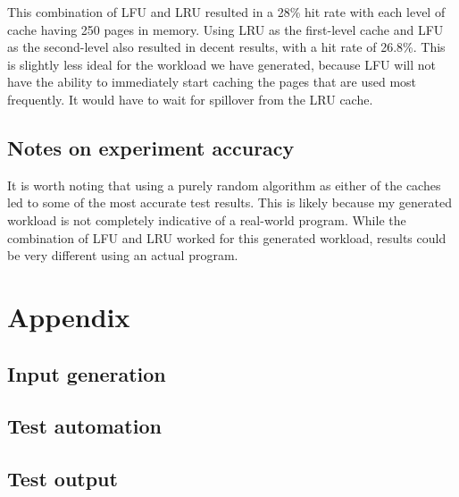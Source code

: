 \documentclass[paper=a4, fontsize=11pt]{scrartcl} %
\numberwithin{equation}{section} %
\numberwithin{figure}{section} %
\numberwithin{table}{section} %
\begin{document}
This combination of LFU and LRU resulted in a 28\% hit rate with each level of cache having 250 pages in memory. Using LRU as the first-level cache and LFU as the second-level also resulted in decent results, with a hit rate of 26.8\%. This is slightly less ideal for the workload we have generated, because LFU will not have the ability to immediately start caching the pages that are used most frequently. It would have to wait for spillover from the LRU cache.

\subsection{Notes on experiment accuracy}
It is worth noting that using a purely random algorithm as either of the caches led to some of the most accurate test results. This is likely because my generated workload is not completely indicative of a real-world program. While the combination of LFU and LRU worked for this generated workload, results could be very different using an actual program.

\pagebreak


\section{Appendix}


\subsection{Input generation} \label{createInputs}



\subsection{Test automation} \label{runTests}



\subsection{Test output} \label{output}

\end{document}
